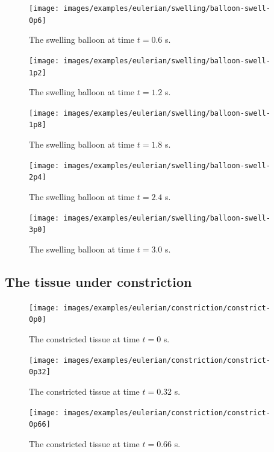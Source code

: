\begin{figure}[!hpt]
\centering
\texttt{[image: images/examples/eulerian/swelling/balloon-swell-0p6]}
\caption{The swelling balloon at time $t=0.6$ s.} 
\label{swelling-balloon-image-0p6}
\end{figure}

\begin{figure}[!hpt]
\centering
\texttt{[image: images/examples/eulerian/swelling/balloon-swell-1p2]}
\caption{The swelling balloon at time $t=1.2$ s.} 
\label{swelling-balloon-image-1p2}
\end{figure}

\begin{figure}[!hpt]
\centering
\texttt{[image: images/examples/eulerian/swelling/balloon-swell-1p8]}
\caption{The swelling balloon at time $t=1.8$ s.} 
\label{swelling-balloon-image-1p8}
\end{figure}

\begin{figure}[!hpt]
\centering
\texttt{[image: images/examples/eulerian/swelling/balloon-swell-2p4]}
\caption{The swelling balloon at time $t=2.4$ s.} 
\label{swelling-balloon-image-2p4}
\end{figure}

\begin{figure}[!hpt]
\centering
\texttt{[image: images/examples/eulerian/swelling/balloon-swell-3p0]}
\caption{The swelling balloon at time $t=3.0$ s.} 
\label{swelling-balloon-image-3p0}
\end{figure}

\subsection{The tissue under constriction}
\label{constriction-2}

\begin{figure}[!hpt]
\centering
\texttt{[image: images/examples/eulerian/constriction/constrict-0p0]}
\caption{The constricted tissue at time $t=0$ s.} 
\label{constrict-image-0p0}
\end{figure}

\begin{figure}[!hpt]
\centering
\texttt{[image: images/examples/eulerian/constriction/constrict-0p32]}
\caption{The constricted tissue at time $t=0.32$ s.} 
\label{constrict-image-0p32}
\end{figure}

\begin{figure}[!hpt]
\centering
\texttt{[image: images/examples/eulerian/constriction/constrict-0p66]}
\caption{The constricted tissue at time $t=0.66$ s.} 
\label{constrict-image-0p66}
\end{figure}

